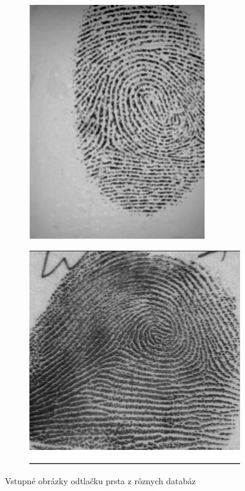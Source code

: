\documentclass[11pt,a4paper]{article}
\begin{document}
\begin{figure}[h]
\begin{subfigure}{0.25\textwidth}
		\includegraphics[width=.95\linewidth]{images/Screenshot_3}
	\end{subfigure}%
	\begin{subfigure}{0.25\textwidth}
	\centering
	\includegraphics[width=.95\linewidth]{images/Screenshot_4}
\end{subfigure}%
	\caption{Vstupné obrázky odtlačku prsta z rôznych databáz}
	\label{fig:1}
\end{figure}
\end{document}
